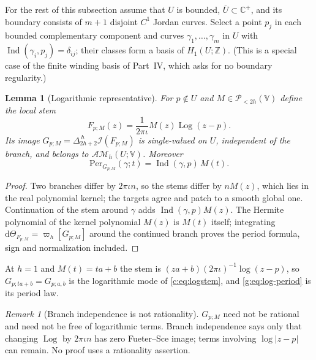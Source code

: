 \documentclass[11pt,a4paper]{article}
\numberwithin{equation}{section}
\newtheorem{lemma}[theorem]{Lemma}
\theoremstyle{definition}
\theoremstyle{remark}
\newtheorem{remark}[theorem]{Remark}
\theoremstyle{plain}
\newcommand{\CC}{\mathbb C}
\newcommand{\ZZ}{\mathbb Z}
\newcommand{\Cplus}{\CC^{+}}
\DeclareMathOperator{\Ind}{Ind}
\newcommand{\I}{\mathcal I}
\newcommand{\AM}{\mathcal{AM}}
\newcommand{\Per}{\mathrm{Per}}
\newcommand{\abs}[1]{\lvert #1\rvert}
\newcommand{\dd}{\mathrm d}
\newcommand{\lapH}{\Delta_{2h+2}^{\,h}}
\newcommand{\VV}{\mathbb V}                       %
\newcommand{\PolH}{\mathscr P_{<2h}(\VV)}
\newcommand{\cur}{\varpi}                         %
\newcommand{\Herm}{\Theta}                        %
\begin{document}
For the rest of this subsection assume that $U$ is bounded,
$\overline U\subset\Cplus$, and its boundary consists of $m+1$ disjoint $C^1$
Jordan curves. Select a point $p_j$ in each bounded complementary component
and curves $\gamma_1,\dots,\gamma_m$ in $U$ with
$\Ind(\gamma_i,p_j)=\delta_{ij}$; their classes form a basis of $H_1(U;\ZZ)$.
(This is a special case of the finite winding basis of Part~IV, which asks
for no boundary regularity.)

\begin{lemma}[Logarithmic representative]
\label{g:lem:log-representative}
For $p\notin U$ and $M\in\PolH$ define the local stem
\begin{equation}\label{g:eq:log-stem}
 F_{p;M}(z)=\frac1{2\pi\iota}M(z)\operatorname{Log}(z-p).
\end{equation}
Its image $G_{p;M}=\lapH\I(F_{p;M})$ is single-valued on $U$, independent of the
branch, and belongs to $\AM_h(U;\VV)$. Moreover
\begin{equation}\label{g:eq:log-period}
 \Per_{G_{p;M}}(\gamma;t)=\Ind(\gamma,p)\,M(t).
\end{equation}
\end{lemma}

\begin{proof}
Two branches differ by $2\pi\iota n$, so the stems differ by $nM(z)$, which lies
in the real polynomial kernel; the targets agree and patch to a smooth global
one. Continuation of the stem around $\gamma$ adds $\Ind(\gamma,p)M(z)$. The
Hermite polynomial of the kernel polynomial $M(z)$ is $M(t)$ itself;
integrating $\dd\Herm_{F_{p;M}}=\cur_h[G_{p;M}]$ around the continued branch
proves the period formula, sign and normalization included.
\end{proof}

At $h=1$ and $M(t)=ta+b$ the stem is $(za+b)(2\pi\iota)^{-1}\log(z-p)$, so
$G_{p;ta+b}=G_{p;a,b}$ is the logarithmic mode of \eqref{c:eq:logstem}, and
\eqref{g:eq:log-period} is its period law.

\begin{remark}[Branch independence is not rationality]
\label{g:rem:not-rational}
$G_{p;M}$ need not be rational and need not be free of logarithmic terms.
Branch independence says only that changing $\operatorname{Log}$ by
$2\pi\iota n$ has zero Fueter--Sce image; terms involving $\log\abs{z-p}$ can
remain. No proof uses a rationality assertion.
\end{remark}
\end{document}
